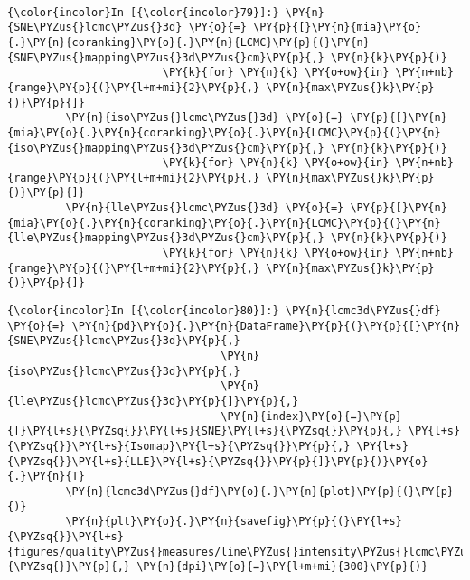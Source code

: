     \begin{center}
    \end{center}
    { \hspace*{\fill} \\}

    \begin{Verbatim}[commandchars=\\\{\}]
{\color{incolor}In [{\color{incolor}79}]:} \PY{n}{SNE\PYZus{}lcmc\PYZus{}3d} \PY{o}{=} \PY{p}{[}\PY{n}{mia}\PY{o}{.}\PY{n}{coranking}\PY{o}{.}\PY{n}{LCMC}\PY{p}{(}\PY{n}{SNE\PYZus{}mapping\PYZus{}3d\PYZus{}cm}\PY{p}{,} \PY{n}{k}\PY{p}{)}
                        \PY{k}{for} \PY{n}{k} \PY{o+ow}{in} \PY{n+nb}{range}\PY{p}{(}\PY{l+m+mi}{2}\PY{p}{,} \PY{n}{max\PYZus{}k}\PY{p}{)}\PY{p}{]}
         \PY{n}{iso\PYZus{}lcmc\PYZus{}3d} \PY{o}{=} \PY{p}{[}\PY{n}{mia}\PY{o}{.}\PY{n}{coranking}\PY{o}{.}\PY{n}{LCMC}\PY{p}{(}\PY{n}{iso\PYZus{}mapping\PYZus{}3d\PYZus{}cm}\PY{p}{,} \PY{n}{k}\PY{p}{)}
                        \PY{k}{for} \PY{n}{k} \PY{o+ow}{in} \PY{n+nb}{range}\PY{p}{(}\PY{l+m+mi}{2}\PY{p}{,} \PY{n}{max\PYZus{}k}\PY{p}{)}\PY{p}{]}
         \PY{n}{lle\PYZus{}lcmc\PYZus{}3d} \PY{o}{=} \PY{p}{[}\PY{n}{mia}\PY{o}{.}\PY{n}{coranking}\PY{o}{.}\PY{n}{LCMC}\PY{p}{(}\PY{n}{lle\PYZus{}mapping\PYZus{}3d\PYZus{}cm}\PY{p}{,} \PY{n}{k}\PY{p}{)}
                        \PY{k}{for} \PY{n}{k} \PY{o+ow}{in} \PY{n+nb}{range}\PY{p}{(}\PY{l+m+mi}{2}\PY{p}{,} \PY{n}{max\PYZus{}k}\PY{p}{)}\PY{p}{]}
\end{Verbatim}

    \begin{Verbatim}[commandchars=\\\{\}]
{\color{incolor}In [{\color{incolor}80}]:} \PY{n}{lcmc3d\PYZus{}df} \PY{o}{=} \PY{n}{pd}\PY{o}{.}\PY{n}{DataFrame}\PY{p}{(}\PY{p}{[}\PY{n}{SNE\PYZus{}lcmc\PYZus{}3d}\PY{p}{,}
                                 \PY{n}{iso\PYZus{}lcmc\PYZus{}3d}\PY{p}{,}
                                 \PY{n}{lle\PYZus{}lcmc\PYZus{}3d}\PY{p}{]}\PY{p}{,}
                                 \PY{n}{index}\PY{o}{=}\PY{p}{[}\PY{l+s}{\PYZsq{}}\PY{l+s}{SNE}\PY{l+s}{\PYZsq{}}\PY{p}{,} \PY{l+s}{\PYZsq{}}\PY{l+s}{Isomap}\PY{l+s}{\PYZsq{}}\PY{p}{,} \PY{l+s}{\PYZsq{}}\PY{l+s}{LLE}\PY{l+s}{\PYZsq{}}\PY{p}{]}\PY{p}{)}\PY{o}{.}\PY{n}{T}
         \PY{n}{lcmc3d\PYZus{}df}\PY{o}{.}\PY{n}{plot}\PY{p}{(}\PY{p}{)}
         \PY{n}{plt}\PY{o}{.}\PY{n}{savefig}\PY{p}{(}\PY{l+s}{\PYZsq{}}\PY{l+s}{figures/quality\PYZus{}measures/line\PYZus{}intensity\PYZus{}lcmc\PYZus{}3d.png}\PY{l+s}{\PYZsq{}}\PY{p}{,} \PY{n}{dpi}\PY{o}{=}\PY{l+m+mi}{300}\PY{p}{)}
\end{Verbatim}

